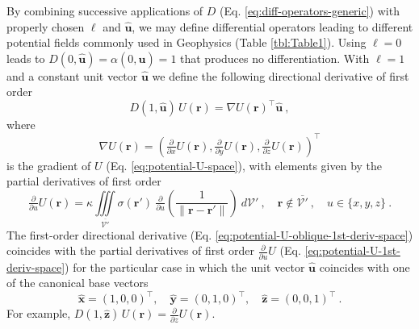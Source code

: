 By combining successive applications of $D$ 
(Eq. \ref{eq:diff-operators-generic}) with properly chosen $\ell$ and $\hat{\mathbf{u}}$, 
we may define differential operators leading to different potential fields commonly used 
in Geophysics (Table \ref{tbl:Table1}).
Using $\ell = 0$ leads to $D(0, \hat{\mathbf{u}}) = \alpha(0, \hat{\mathbf{u}}) = 1$ that produces 
no differentiation.
With $\ell = 1$ and a constant unit vector $\hat{\mathbf{u}}$ we define the following
directional derivative of first order
\begin{equation}
	D(1, \hat{\mathbf{u}}) \, U(\mathbf{r}) = \nabla U(\mathbf{r})^{\top} \hat{\mathbf{u}} \: ,
	\label{eq:potential-U-oblique-1st-deriv-space}
\end{equation}
where
\begin{equation}
	\nabla U(\mathbf{r}) = \left( 
	\tfrac{\partial}{\partial x} U(\mathbf{r}),
	\tfrac{\partial}{\partial y} U(\mathbf{r}),
	\tfrac{\partial}{\partial z} U(\mathbf{r}) \right)^{\top}
	\label{eq:potential-U-grad-space}
\end{equation}
is the gradient of $U$ (Eq. \ref{eq:potential-U-space}), with elements
given by the partial derivatives of first order
\begin{equation}
	\tfrac{\partial}{\partial u} U(\mathbf{r}) = \kappa \iiint\limits_{\overline{\mathcal{V}'}}
	\sigma(\mathbf{r}') \: 
	\tfrac{\partial}{\partial u} \left( \frac{1}{\| \mathbf{r} - \mathbf{r}'\|} \right)
	\: d\mathcal{V}' \: , 
	\quad \mathbf{r} \notin \overline{\mathcal{V}'} \: , \quad u \in \{ x, y, z \} \: .
	\label{eq:potential-U-1st-deriv-space}
\end{equation}
The first-order directional derivative (Eq. \ref{eq:potential-U-oblique-1st-deriv-space})
coincides with the partial derivatives of first order $\tfrac{\partial}{\partial u} U$ (Eq. \ref{eq:potential-U-1st-deriv-space})
for the particular case in which the unit vector $\hat{\mathbf{u}}$ coincides with one of the canonical base vectors
\begin{equation}
	\hat{\mathbf{x}} = (1,0,0)^{\top} , \quad 
	\hat{\mathbf{y}} = (0,1,0)^{\top} , \quad
	\hat{\mathbf{z}} = (0,0,1)^{\top} \: .
	\label{eq:canonical-base-vector}
\end{equation}
For example, $D(1, \hat{\mathbf{z}}) \, U(\mathbf{r}) = \tfrac{\partial}{\partial z} U(\mathbf{r})$.

